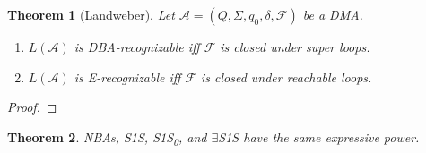 \documentclass{article}
\newtheorem{theorem}{Theorem}
\begin{document}
\vspace{1cm}
\begin{theorem}[Landweber]
\label{landweber}
	Let $\mathcal{A} = (Q, \Sigma, q_0, \delta, \mathcal{F})$ be a DMA. 
	\begin{enumerate}
		\item $L(\mathcal{A})$ is DBA-recognizable iff $\mathcal{F}$ is closed under super loops.
		\item $L(\mathcal{A})$ is E-recognizable iff $\mathcal{F}$ is closed under reachable loops.
	\end{enumerate}
\end{theorem}
\begin{proof}
\end{proof}


\vspace{1cm}
\begin{theorem}
\label{mso_nba}
	NBAs, S1S, S1S\textsubscript{0}, and $\exists$S1S have the same expressive power.
\end{theorem}
\end{document}

